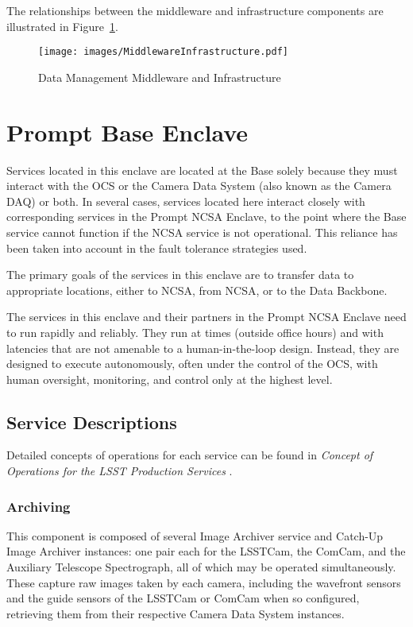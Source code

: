 \documentclass[DM,toc,lsstdraft]{lsstdoc}
\begin{document}
The relationships between the middleware and infrastructure components
are illustrated in Figure~\ref{fig:mwandinfra}.

\begin{figure}
\centering
\texttt{[image: images/MiddlewareInfrastructure.pdf]}
\caption{Data Management Middleware and Infrastructure}
\label{fig:mwandinfra}
\end{figure}


\section{Prompt Base Enclave}\label{prompt-base-enclave}

Services located in this enclave are located at the Base solely because
they must interact with the OCS or the Camera Data System (also known as
the Camera DAQ) or both. In several cases, services located here
interact closely with corresponding services in the Prompt NCSA Enclave,
to the point where the Base service cannot function if the
NCSA service is not operational. This reliance has been taken into
account in the fault tolerance strategies used.

The primary goals of the services in this enclave are to transfer data
to appropriate locations, either to NCSA, from NCSA, or to the Data
Backbone.

The services in this enclave and their partners in the Prompt NCSA Enclave
need to run rapidly and reliably. They run at times
(outside office hours) and with latencies that are not amenable to a
human-in-the-loop design. Instead, they are designed to execute
autonomously, often under the control of the OCS, with human oversight,
monitoring, and control only at the highest level.

\subsection{Service Descriptions}\label{base-service-descriptions}

Detailed concepts of operations for each service can be found in
\textit{Concept of Operations for the LSST Production Services} .


\subsubsection{Archiving}\label{archiving}

This component is composed of several Image Archiver service and
Catch-Up Image Archiver instances: one pair each for the LSSTCam, the
ComCam, and the Auxiliary Telescope Spectrograph, all of which may be
operated simultaneously. These capture raw images taken by each camera,
including the wavefront sensors and the guide sensors of the LSSTCam or
ComCam when so configured, retrieving them from their respective Camera
Data System instances.
\end{document}
